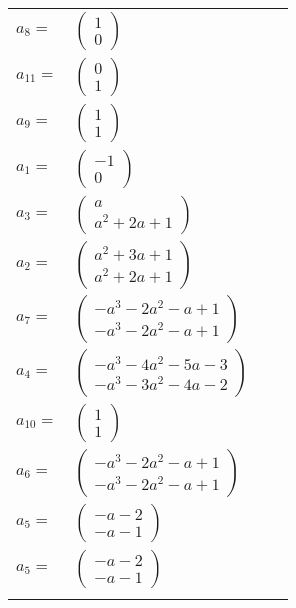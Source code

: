 \documentclass[1p]{elsarticle_modified}
\theoremstyle{definition}
\begin{document}
\begin{tabular}{m{7pt} m{180pt} m{7pt} m{180pt} }
\flushright $a_{8}=$&$\begin{pmatrix}1\\0\end{pmatrix}$ \\
\flushright $a_{11}=$&$\begin{pmatrix}0\\1\end{pmatrix}$ \\
\flushright $a_{9}=$&$\begin{pmatrix}1\\1\end{pmatrix}$ \\
\flushright $a_{1}=$&$\begin{pmatrix}-1\\0\end{pmatrix}$ \\
\flushright $a_{3}=$&$\begin{pmatrix}a\\a^2+2 a+1\end{pmatrix}$ \\
\flushright $a_{2}=$&$\begin{pmatrix}a^2+3 a+1\\a^2+2 a+1\end{pmatrix}$ \\
\flushright $a_{7}=$&$\begin{pmatrix}- a^3-2 a^2- a+1\\- a^3-2 a^2- a+1\end{pmatrix}$ \\
\flushright $a_{4}=$&$\begin{pmatrix}- a^3-4 a^2-5 a-3\\- a^3-3 a^2-4 a-2\end{pmatrix}$ \\
\flushright $a_{10}=$&$\begin{pmatrix}1\\1\end{pmatrix}$ \\
\flushright $a_{6}=$&$\begin{pmatrix}- a^3-2 a^2- a+1\\- a^3-2 a^2- a+1\end{pmatrix}$ \\
\flushright $a_{5}=$&$\begin{pmatrix}- a-2\\- a-1\end{pmatrix}$\\ \flushright $a_{5}=$&$\begin{pmatrix}- a-2\\- a-1\end{pmatrix}$\\&\end{tabular}
\end{document}
